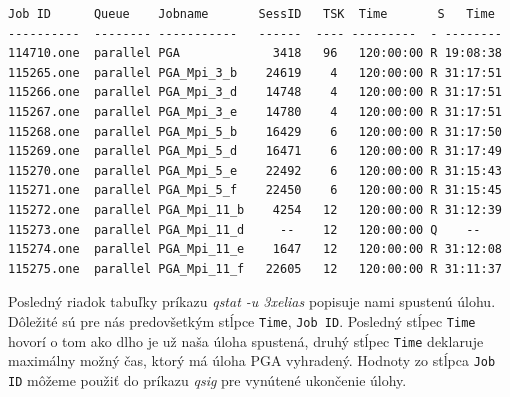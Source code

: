 \begin{lstlisting}[caption={qstat -u 3xelias}]
Job ID      Queue    Jobname       SessID   TSK  Time       S   Time
----------  -------- -----------   ------  ---- ---------  - --------
114710.one  parallel PGA             3418   96   120:00:00 R 19:08:38
115265.one  parallel PGA_Mpi_3_b    24619    4   120:00:00 R 31:17:51
115266.one  parallel PGA_Mpi_3_d    14748    4   120:00:00 R 31:17:51
115267.one  parallel PGA_Mpi_3_e    14780    4   120:00:00 R 31:17:51
115268.one  parallel PGA_Mpi_5_b    16429    6   120:00:00 R 31:17:50
115269.one  parallel PGA_Mpi_5_d    16471    6   120:00:00 R 31:17:49
115270.one  parallel PGA_Mpi_5_e    22492    6   120:00:00 R 31:15:43
115271.one  parallel PGA_Mpi_5_f    22450    6   120:00:00 R 31:15:45
115272.one  parallel PGA_Mpi_11_b    4254   12   120:00:00 R 31:12:39
115273.one  parallel PGA_Mpi_11_d     --    12   120:00:00 Q    -- 
115274.one  parallel PGA_Mpi_11_e    1647   12   120:00:00 R 31:12:08
115275.one  parallel PGA_Mpi_11_f   22605   12   120:00:00 R 31:11:37
\end{lstlisting}
Posledný riadok tabuľky príkazu \textit{qstat -u 3xelias} popisuje nami spustenú úlohu.
Dôležité sú pre nás predovšetkým stĺpce \texttt{Time}, \texttt{Job ID}.
Posledný stĺpec \texttt{Time} hovorí o tom ako dlho je už naša úloha spustená, druhý stĺpec \texttt{Time} deklaruje maximálny možný čas,
ktorý má úloha PGA vyhradený. Hodnoty zo stĺpca \texttt{Job ID} môžeme použiť do príkazu \textit{qsig} pre vynútené ukončenie úlohy.
